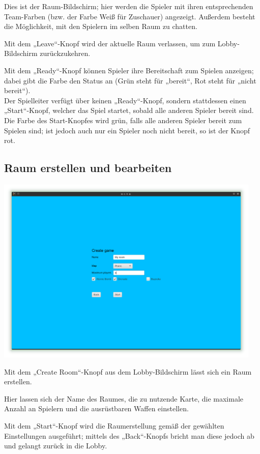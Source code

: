 \documentclass{scrreprt}
\begin{document}
Dies ist der Raum-Bildschirm; hier werden die Spieler mit ihren entsprechenden Team-Farben (bzw. der Farbe Weiß für
Zuschauer) angezeigt. Außerdem besteht die Möglichkeit, mit den Spielern im selben Raum zu chatten.

Mit dem „Leave“-Knopf wird der aktuelle Raum verlassen, um zum Lobby-Bildschirm zurückzukehren.

Mit dem „Ready“-Knopf können Spieler ihre Bereitschaft zum Spielen anzeigen; dabei gibt die Farbe den Status an (Grün steht für „bereit“,
Rot steht für „nicht bereit“).\\
Der Spielleiter verfügt über keinen „Ready“-Knopf, sondern stattdessen einen „Start“-Knopf, welcher das Spiel startet, sobald alle anderen Spieler bereit sind. Die Farbe des Start-Knopfes wird grün, falls alle anderen Spieler bereit zum Spielen sind; ist jedoch auch nur ein Spieler noch nicht bereit, so ist der Knopf rot.

\subsection{Raum erstellen und bearbeiten}

\includegraphics[height=9cm]{Screenshot14.png}

Mit dem „Create Room“-Knopf aus dem Lobby-Bildschirm lässt sich ein Raum erstellen.

Hier lassen sich der Name des Raumes, die zu nutzende Karte, die maximale Anzahl an Spielern und die ausrüstbaren Waffen einstellen.

Mit dem „Start“-Knopf wird die Raumerstellung gemäß der gewählten Einstellungen ausgeführt; mittels des „Back“-Knopfs bricht man diese jedoch ab und gelangt zurück in die Lobby.
\end{document}
